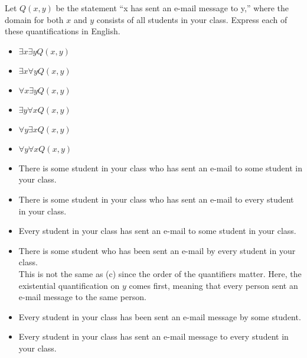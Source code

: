\documentclass[addpoints]{exam}
\newenvironment{problem}[2][Problem]{\begin{trivlist}
    \item[\hskip \labelsep {\bfseries #1}\hskip \labelsep {\bfseries #2.}]}{\end{trivlist}}
\begin{document}
\begin{sloppypar}
\begin{problem}{15}
Let $Q(x,y)$ be the statement ``x has sent an e-mail message to y,'' where the domain for both $x$ and $y$ consists of all students in your class. Express each of these quantifications in English.
\begin{itemize}
    \item[(a)] $\exists x \exists y Q(x,y)$
    \item[(b)] $\exists x \forall y Q(x,y)$
    \item[(c)] $\forall x \exists y Q(x,y)$
    \item[(d)] $\exists y \forall x Q(x,y)$
    \item[(e)] $\forall y \exists x Q(x,y)$
    \item[(f)] $\forall y \forall x Q(x,y)$
\end{itemize}
\end{problem}

\begin{questions}
    \question
    \begin{solution}
        \begin{itemize}
            \item[(a)] There is some student in your class who has sent an e-mail to some student in your class.
            \item[(b)] There is some student in your class who has sent an e-mail to every student in your class.
            \item[(c)] Every student in your class has sent an e-mail to some student in your class.
            \item[(d)] There is some student who has been sent an e-mail by every student in your class. \\ This is not the same as (c) since the order of the quantifiers matter. Here, the existential quantification on $y$ comes first, meaning that every person sent an e-mail message to the same person.
            \item[(e)] Every student in your class has been sent an e-mail message by some student.
            \item[(f)] Every student in your class has sent an e-mail message to every student in your class.  
        \end{itemize}
    \end{solution}
\end{questions}


\end{sloppypar}
\end{document}
